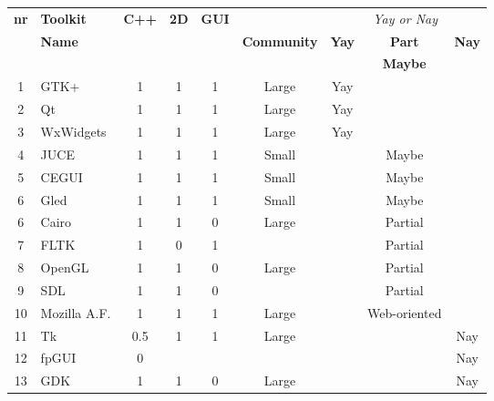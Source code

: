 \begin{center}
    \small\sf
    \begin{tabular}{c|lccc|c|ccc}
	\hline
	{\bf nr} & {\bf Toolkit} & {\bf C++} & {\bf 2D} & {\bf GUI} &            & \multicolumn{3}{c}{\em Yay or Nay} \\
	         & {\bf Name}    & 			 &          &            & {\bf Community} 	& {\bf Yay} & {\bf Part} & {\bf Nay} \\
	         &			     &         	 &          &            &         		&           & {\bf Maybe}  &         \\
        \hline
1  &	GTK+		& 1   & 1 & 1 &  Large  & Yay &         &     \\
2  &	Qt	      	& 1   & 1 & 1 &  Large  & Yay &         &     \\
3  &	WxWidgets 	& 1   & 1 & 1 &  Large  & Yay &         &     \\\hline
4  &	JUCE      	& 1   & 1 & 1 &  Small  &     & Maybe   &     \\
5  &	CEGUI     	& 1   & 1 & 1 &  Small  &     & Maybe   &     \\
6  &	Gled		& 1   & 1 & 1 &  Small  &     & Maybe   &     \\
\hline
6  &	Cairo     	& 1   & 1 & 0 &  Large  &     & Partial &     \\
7  &	FLTK      	& 1   & 0 & 1 &         &     & Partial &     \\
8  &	OpenGL 	  	& 1   & 1 & 0 &  Large  &     & Partial &     \\
9  &	SDL		& 1   & 1 & 0 &         &     & Partial &     \\\hline
10 &	Mozilla A.F.  	& 1   & 1 & 1 &  Large  &     & Web-oriented   &     \\\hline
11 &	Tk	        & 0.5 & 1 & 1 &  Large  &     &         & Nay \\
12 &	fpGUI     	& 0   &   &   &         &     &         & Nay \\
13 &	GDK       	& 1   & 1 & 0 &  Large  &     &         & Nay \\
\hline
    \end{tabular}
	\label{tab:compare-main-req}
\end{center}

